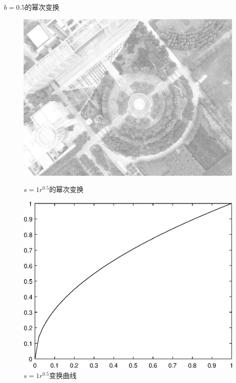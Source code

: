$b=0.5$的幂次变换
\begin{figure}[H]
	\centering
	\begin{minipage}{0.45\linewidth}
		\includegraphics[width=\linewidth]{figure/DJI_0027_Gamma_50.png}
		\caption{$s=1r^{0.5}$的幂次变换}
	\end{minipage}
	\begin{minipage}{0.45\linewidth}
		\includegraphics[width=\linewidth]{figure/DJI_0027_Gamma_50_Graph.eps}
		\caption{$s=1r^{0.5}$变换曲线}
	\end{minipage}
\end{figure}

